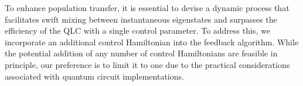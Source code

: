 \documentclass[twocolumn,aps,superscriptaddress,floatfix,longbibliography]{revtex4-2}
\newcommand{\la}{\langle}
\newcommand{\ra}{\rangle}
\begin{document}
To enhance population transfer, it is essential to devise a
dynamic process that facilitates swift mixing between
instantaneous eigenstates and surpasses %
the efficiency of the QLC
with a single control parameter. To address this, we incorporate
an additional control Hamiltonian into the feedback algorithm.
While the potential addition of any number of control
Hamiltonians are feasible in principle, our preference is to
limit it to one due to the practical considerations associated
with quantum circuit implementations. 




\end{document}
